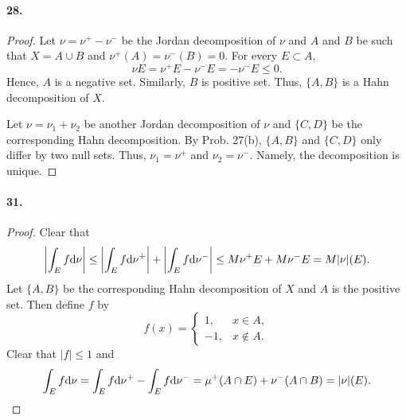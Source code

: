   \paragraph{28.}
  \begin{proof}
    Let $\nu=\nu^+-\nu^-$ be the Jordan decomposition of $\nu$ and $A$ and $B$
    be such that $X=A\cup B$ and $\nu^+(A)=\nu^-(B)=0$. For every $E\subset A$,
    \[
      \nu E=\nu^+E-\nu^-E=-\nu^-E\le 0.
    \]
    Hence, $A$ is a negative set. Similarly, $B$ is positive set. Thus, $\{A,
    B\}$ is a Hahn decomposition of $X$.\par
    Let $\nu=\nu_1+\nu_2$ be another Jordan decomposition of $\nu$ and $\{C,
    D\}$ be the corresponding Hahn decomposition. By Prob. 27(b), $\{A,B\}$ and
    $\{C,D\}$ only differ by two null sets. Thus, $\nu_1=\nu^+$ and $\nu_2=
    \nu^-$. Namely, the decomposition is unique.
  \end{proof}
  
  \paragraph{31.}
  \begin{proof}
    Clear that
    \begin{align*}
      \left|\int_E f\mathrm{d}\nu\right|
      \le \left|\int_E f\mathrm{d}\nu^+\right|+\left|\int_E f\mathrm{d}\nu^-\right|
      \le M\nu^+E+M\nu^-E=M|\nu|(E).
    \end{align*}
    Let $\{A,B\}$ be the corresponding Hahn decomposition of $X$ and $A$ is the
    positive set. Then define $f$ by
    \[
      f(x)=\begin{cases}
        1, & x\in A,\\
        -1, & x\notin A.
      \end{cases}
    \]
    Clear that $|f|\le 1$ and
    \[
      \int_E f\mathrm{d}\nu=
      \int_E f\mathrm{d}\nu^+-\int_E f\mathrm{d}\nu^-=
      \mu^+(A\cap E)+\nu^-(A\cap B)=
      |\nu|(E).
    \]
  \end{proof}
  
